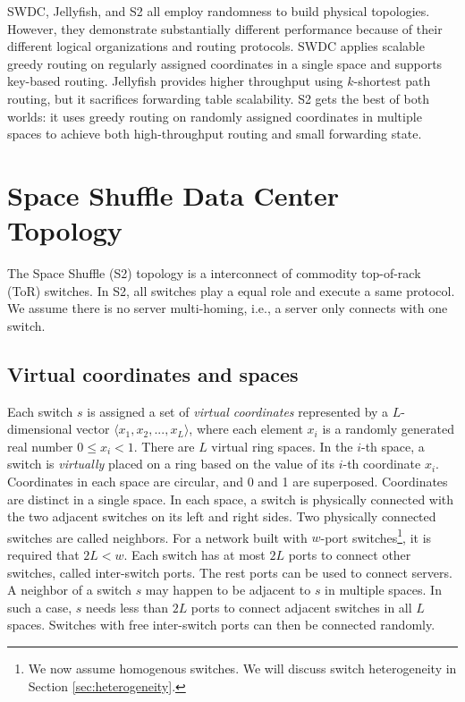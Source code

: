 \documentclass[10pt,conference]{IEEEtran}
\begin{document}
SWDC, Jellyfish, and S2 all employ randomness to build physical topologies. However, they demonstrate substantially different performance because of their different logical organizations and routing protocols. SWDC applies scalable greedy routing on regularly assigned coordinates in a single space and supports key-based routing. Jellyfish provides higher throughput using $k$-shortest path routing, but it sacrifices forwarding table scalability.
S2 gets the best of both worlds: it uses greedy routing on randomly assigned coordinates in multiple spaces to achieve both high-throughput routing and small forwarding state.


\section{Space Shuffle Data Center Topology}
\label{sec:topo}
The Space Shuffle (S2) topology is a
interconnect of commodity top-of-rack (ToR) switches.
In S2, all switches play a equal role and execute a same protocol.
We assume there is no server multi-homing, i.e., a server only connects with one switch.

\subsection{Virtual coordinates and spaces}

Each switch $s$ is assigned a set of \emph{virtual coordinates} represented by a $L$-dimensional vector $\langle x_{1}, x_{2}, ..., x_{L} \rangle$, where each element $x_{i}$ is a randomly generated real number  $0\leq x_{i}<1$.
There are $L$ virtual ring spaces.
In the $i$-th space, a switch is \emph{virtually} placed on a ring based on the value of its $i$-th coordinate $x_i$.
Coordinates in each space are circular, and 0 and 1 are superposed.
Coordinates are distinct in a single space.
In each space, a switch is physically connected with the two adjacent switches on its left and right sides.
Two physically connected switches are called neighbors.
For a network built with $w$-port switches\footnote{We now assume homogenous switches. We will discuss switch heterogeneity in Section \ref{sec:heterogeneity}.}, it is required that $2L < w$.
Each switch has at most $2L$ ports to connect other switches, called inter-switch ports.
The rest ports can be used to connect servers.
A neighbor of a switch $s$ may happen to be adjacent to $s$ in multiple spaces. In such a case, $s$ needs less than $2L$ ports to connect adjacent switches in all $L$ spaces.
Switches with free inter-switch ports can then be connected randomly.
\end{document}
